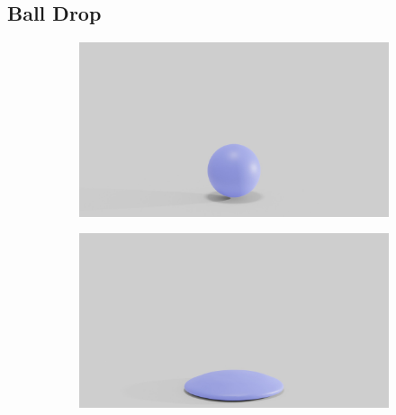 \subsection{Ball Drop}

\begin{figure}[htp!]
	\centering
	\begin{subfigure}{.03\linewidth}
	\end{subfigure}%
	\begin{subfigure}{.16\linewidth}
		\centering
		{\includegraphics[width=2.0\textwidth]{images/soft_ball/045/0200.jpg}}
		\label{sfig:ball-045-1}
	\end{subfigure}%
	\begin{subfigure}{.16\linewidth}
		\centering
		{\includegraphics[width=2.0\textwidth]{images/soft_ball/045/0250.jpg}}
		\label{sfig:ball-045-2}
	\end{subfigure}%

\end{figure}
